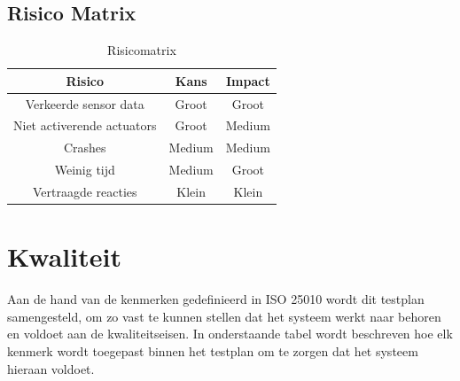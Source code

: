 \documentclass[a4paper]{report}
\begin{document}
\subsection{Risico Matrix}
\begin{table}[h]
  \centering
  \begin{tabular}{|c|c|c|}
    \hline
    \textbf{Risico} & \textbf{Kans} & \textbf{Impact} \\
    \hline 
    Verkeerde sensor data  & \cellcolor{red} Groot & \cellcolor{red} Groot \\
    \hline 
    Niet activerende actuators & \cellcolor{red} Groot & \cellcolor{orange} Medium \\
    \hline 
    Crashes &\cellcolor{orange} Medium &\cellcolor{red} Medium  \\  
    \hline
    Weinig tijd &\cellcolor{orange} Medium &\cellcolor{red} Groot  \\ 
    \hline
    Vertraagde reacties &\cellcolor{green} Klein &\cellcolor{green} Klein  \\  
    \hline
  \end{tabular}
  \caption{Risicomatrix}
  \label{tab:risicomatrix}
\end{table}

\section{Kwaliteit}
Aan de hand van de kenmerken gedefinieerd in ISO 25010 wordt dit testplan samengesteld, om zo vast te kunnen stellen dat het systeem werkt naar behoren en voldoet aan de kwaliteitseisen.
In onderstaande tabel wordt beschreven hoe elk kenmerk wordt toegepast binnen het testplan om te zorgen dat het systeem hieraan voldoet.
\end{document}
